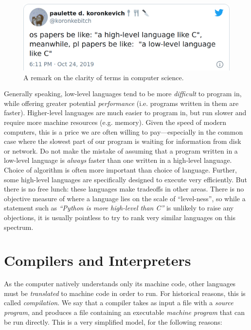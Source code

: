 \begin{figure}
  \centering
  \includegraphics[width=\textwidth]{img/highleveltweet.png}
  \caption{A remark on the clarity of terms in computer science.}
  \label{fig:koronkebitch}
\end{figure}

Generally speaking, low-level languages tend to be more
\textit{difficult} to program in, while offering greater potential
\textit{performance} (i.e. programs written in them are faster).
Higher-level languages are much easier to program in, but run slower
and require more machine resources (e.g. memory).  Given the speed of
modern computers, this is a price we are often willing to
pay---especially in the common case where the slowest part of our
program is waiting for information from disk or network.  Do not make
the mistake of assuming that a program written in a low-level language
is \textit{always} faster than one written in a high-level language.
Choice of algorithm is often more important than choice of language.
Further, some high-level languages are specifically designed to
execute very efficiently.  But there is no free lunch: these languages
make tradeoffs in other areas.  There is no objective measure of where
a language lies on the scale of ``level-ness'', so while a statement
such as \textit{``Python is more high-level than C''} is unlikely to
raise any objections, it is usually pointless to try to rank very
similar languages on this spectrum.

\section{Compilers and Interpreters}

As the computer natively understands only its machine code, other
languages must be \textit{translated} to machine code in order to run.
For historical reasons, this is called \textit{compilation}.  We say
that a compiler takes as input a file with a \textit{source program},
and produces a file containing an executable \textit{machine program}
that can be run directly.  This is a very simplified model, for the
following reasons:

